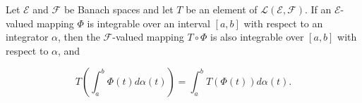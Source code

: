 Let $\mathcal{E}$ and $\mathcal{F}$ be Banach spaces and let $T$ be an element of $\mathcal{L}(\mathcal{E}, \mathcal{F})$. If an $\mathcal{E}$-valued mapping $\Phi$ is integrable over an interval $[a, b]$ with respect to an integrator $\alpha$, then the $\mathcal{F}$-valued mapping $T \circ \Phi$ is also integrable over $[a, b]$ with respect to $\alpha$, and

$$T \left( \int_a^b \Phi(t) d\alpha(t) \right) = \int_a^b T(\Phi(t)) d\alpha(t).$$
